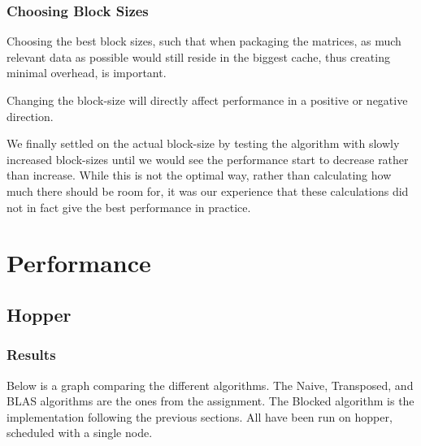 \documentclass[a4paper.11pt,oneside]{book}
\begin{document}
\subsection{Choosing Block Sizes}

Choosing the best block sizes, such that when packaging the matrices, as much
relevant data as possible would still reside in the biggest cache, thus creating
minimal overhead, is important.

Changing the block-size will directly affect performance in a positive or
negative direction.

We finally settled on the actual block-size by testing the algorithm with slowly
increased block-sizes until we would see the performance start to decrease
rather than increase. While this is not the optimal way, rather than calculating
how much there should be room for, it was our experience that these calculations
did not in fact give the best performance in practice.

\chapter{Performance}


\section{Hopper}
\subsection{Results}


Below is a graph comparing the different algorithms. The Naive, Transposed, and
BLAS algorithms are the ones from the assignment. The Blocked algorithm is the
implementation following the previous sections. All have been run on hopper,
scheduled with a single node.
\end{document}
